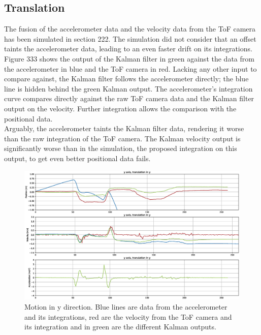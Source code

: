 \subsection{Translation}
\label{sec:kalman_translation_results}
The fusion of the accelerometer data and the velocity data from the ToF camera has been simulated in section 222. The simulation did not consider that an offset taints the accelerometer data, leading to an even faster drift on its integrations. Figure 333 shows the output of the Kalman filter in green against the data from the accelerometer in blue and the ToF camera in red. Lacking any other input to compare against, the Kalman filter follows the accelerometer directly; the blue line is hidden behind the green Kalman output. The accelerometer's integration curve compares directly against the raw ToF camera data and the Kalman filter output on the velocity. Further integration allows the comparison with the positional data.\\
Arguably, the accelerometer taints the Kalman filter data, rendering it worse than the raw integration of the ToF camera. The Kalman velocity output is significantly worse than in the simulation, the proposed integration on this output, to get even better positional data fails.
\begin{figure}[H]
  \centering
  \includegraphics[width=1.0\textwidth]{images/measurement_kalman_translation.eps}
  \caption{Motion in y direction. Blue lines are data from the accelerometer and its integrations, red are the velocity from the ToF camera and its integration and in green are the different Kalman outputs.}
  \label{im:meas_kalman_translation}
\end{figure} 